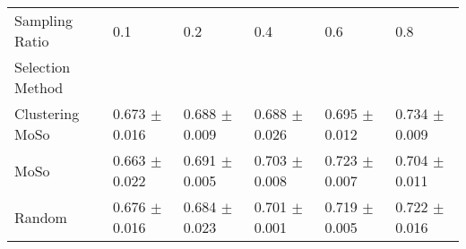 \begin{tabular}{llllll}
\toprule
Sampling Ratio & 0.1 & 0.2 & 0.4 & 0.6 & 0.8 \\
Selection Method &  &  &  &  &  \\
\midrule
Clustering MoSo & 0.673 $\pm$ 0.016 & 0.688 $\pm$ 0.009 & 0.688 $\pm$ 0.026 & 0.695 $\pm$ 0.012 & 0.734 $\pm$ 0.009 \\
MoSo & 0.663 $\pm$ 0.022 & 0.691 $\pm$ 0.005 & 0.703 $\pm$ 0.008 & 0.723 $\pm$ 0.007 & 0.704 $\pm$ 0.011 \\
Random & 0.676 $\pm$ 0.016 & 0.684 $\pm$ 0.023 & 0.701 $\pm$ 0.001 & 0.719 $\pm$ 0.005 & 0.722 $\pm$ 0.016 \\
\bottomrule
\end{tabular}

